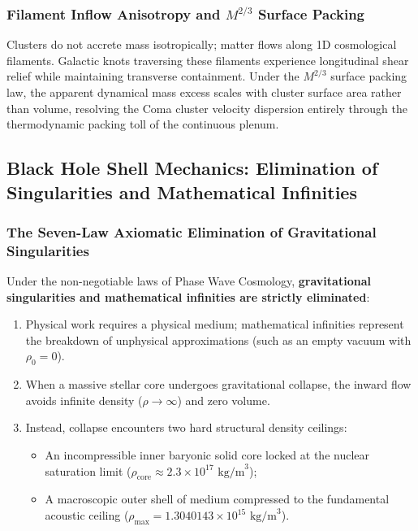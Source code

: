 \documentclass[11pt,a4paper]{article}
\begin{document}
\subsubsection{Filament Inflow Anisotropy and $M^{2/3}$ Surface Packing}
\label{subsubsec:coma_filament}

Clusters do not accrete mass isotropically; matter flows along 1D cosmological filaments. Galactic knots traversing these filaments experience longitudinal shear relief while maintaining transverse containment. Under the $M^{2/3}$ surface packing law, the apparent dynamical mass excess scales with cluster surface area rather than volume, resolving the Coma cluster velocity dispersion entirely through the thermodynamic packing toll of the continuous plenum.

\subsection{Black Hole Shell Mechanics: Elimination of Singularities and Mathematical Infinities}
\label{subsec:black_hole_shells}

\subsubsection{The Seven-Law Axiomatic Elimination of Gravitational Singularities}
\label{subsubsec:bh_axioms}

Under the non-negotiable laws of Phase Wave Cosmology, \textbf{gravitational singularities and mathematical infinities are strictly eliminated}:
\begin{enumerate}
    \item Physical work requires a physical medium; mathematical infinities represent the breakdown of unphysical approximations (such as an empty vacuum with $\rho_0 = 0$).
    \item When a massive stellar core undergoes gravitational collapse, the inward flow avoids infinite density ($\rho \to \infty$) and zero volume.
    \item Instead, collapse encounters two hard structural density ceilings:
    \begin{itemize}
        \item An incompressible inner baryonic solid core locked at the nuclear saturation limit ($\rho_{\text{core}} \approx 2.3 \times 10^{17}\text{ kg/m}^3$);
        \item A macroscopic outer shell of medium compressed to the fundamental acoustic ceiling ($\rho_{\max} = 1.3040143 \times 10^{15}\text{ kg/m}^3$).
    \end{itemize}
\end{enumerate}
\end{document}
